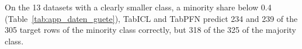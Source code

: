 On the 13 datasets with a clearly smaller class, a minority share below 0.4 (Table~\ref{tab:app_daten_guete}), TabICL and TabPFN predict 234 and 239 of the 305 target rows of the minority class correctly, but 318 of the 325 of the majority class.
